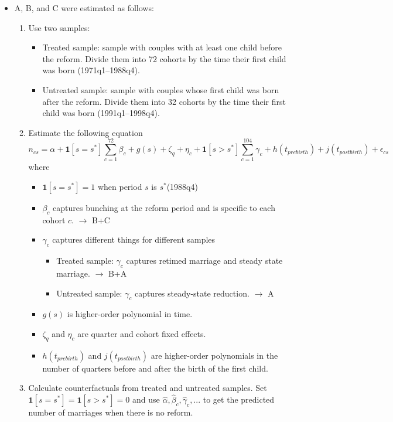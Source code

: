 \documentclass[a4paper, 12pt]{article}
\renewcommand{\vec}[1]{\mathbf{#1}}
\begin{document}
\begin{itemize}
\item A, B, and C were estimated as follows:
\begin{enumerate}
\item Use two samples:
\begin{itemize}
\item Treated sample: sample with couples with at least one child before the reform. Divide them into 72 cohorts by the time their first child was born (1971q1--1988q4).
\item Untreated sample: sample with couples whose first child was born after the reform. Divide them into 32 cohorts by the time their first child was born (1991q1--1998q4).
\end{itemize}
\item Estimate the following equation
\begin{equation}
n_{cs} = \alpha + \vec{1}[s=s^*]\sum_{c=1}^{72}\beta_c + g(s) + \zeta_q + \eta_c +
 \vec{1}[s>s^*]\sum_{c=1}^{104}\gamma_c + h(t_{prebirth}) + j(t_{postbirth}) + \epsilon_{cs}
\end{equation}
where
\begin{itemize}
\item $\vec{1}[s=s^*]=1$ when period $s$ is $s^*$(1988q4)
\item $\beta_c$ captures bunching at the reform period and is specific to each cohort $c$. $\rightarrow$ B+C
\item $\gamma_c$ captures different things for different samples
\begin{itemize}
\item Treated sample: $\gamma_c$ captures retimed marriage and steady state marriage. $\rightarrow$ B+A
\item Untreated sample: $\gamma_c$ captures steady-state reduction. $\rightarrow$ A
\end{itemize}
\item $g(s)$ is higher-order polynomial in time.
\item $\zeta_q$ and $\eta_c$ are quarter and cohort fixed effects.
\item $h(t_{prebirth})$ and $j(t_{postbirth})$ are higher-order polynomials in the number of quarters before and after the birth of the first child.
\end{itemize}
\item Calculate counterfactuals from treated and untreated samples. Set $\vec{1}[s=s^*]=\vec{1}[s>s^*]=0$ and use $\hat{\alpha}, \hat{\beta}_c, \hat{\gamma}_c, ...$ to get the predicted number of marriages when there is no reform.

\end{enumerate}
\end{itemize}
\end{document}
